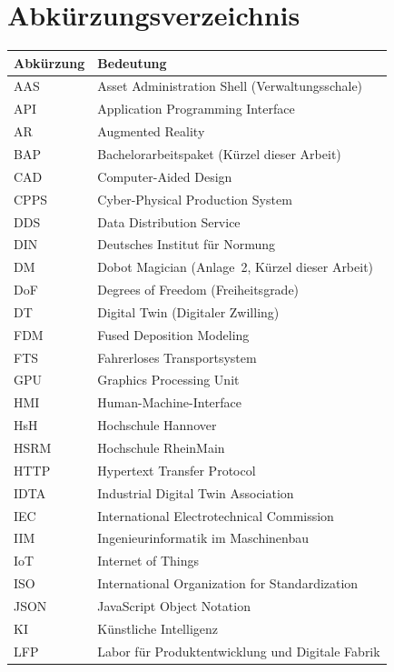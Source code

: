 \newpage
\section*{Abkürzungsverzeichnis}
\begin{longtable}{lp{12.5cm}}
\toprule
\textbf{Abkürzung} & \textbf{Bedeutung} \\
\midrule
\endhead
AAS    & Asset Administration Shell (Verwaltungsschale) \\
API    & Application Programming Interface \\
AR     & Augmented Reality \\
BAP    & Bachelorarbeitspaket (Kürzel dieser Arbeit) \\
CAD    & Computer-Aided Design \\
CPPS   & Cyber-Physical Production System \\
DDS    & Data Distribution Service \\
DIN    & Deutsches Institut für Normung \\
DM     & Dobot Magician (Anlage~2, Kürzel dieser Arbeit) \\
DoF    & Degrees of Freedom (Freiheitsgrade) \\
DT     & Digital Twin (Digitaler Zwilling) \\
FDM    & Fused Deposition Modeling \\
FTS    & Fahrerloses Transportsystem \\
GPU    & Graphics Processing Unit \\
HMI    & Human-Machine-Interface \\
HsH    & Hochschule Hannover \\
HSRM   & Hochschule RheinMain \\
HTTP   & Hypertext Transfer Protocol \\
IDTA   & Industrial Digital Twin Association \\
IEC    & International Electrotechnical Commission \\
IIM    & Ingenieurinformatik im Maschinenbau \\
IoT    & Internet of Things \\
ISO    & International Organization for Standardization \\
JSON   & JavaScript Object Notation \\
KI     & Künstliche Intelligenz \\
LFP    & Labor für Produktentwicklung und Digitale Fabrik \\

\end{longtable}
